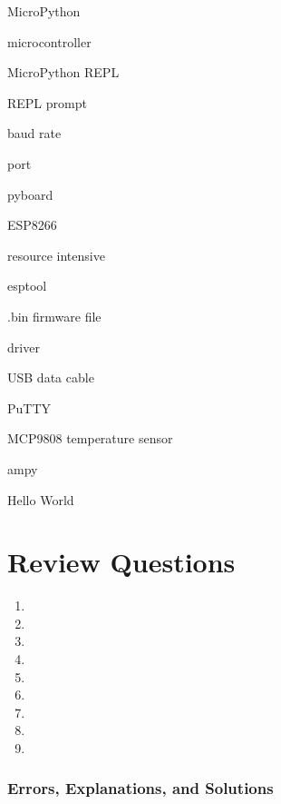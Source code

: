 \documentclass{book}
\newenvironment{problems}{}{}  %
\newenvironment{key_terms}{\begin{multicols}{3}}{\end{multicols}} %
\begin{document}
    
        \begin{key_terms}
        MicroPython

microcontroller

MicroPython REPL

REPL prompt

baud rate

port

pyboard

ESP8266

resource intensive

esptool

.bin firmware file

driver

USB data cable

PuTTY

MCP9808 temperature sensor

ampy

Hello World
        \end{key_terms}

    




    
        \section{Review Questions}\label{review-questions}
    




    
        \begin{problems}
        \begin{enumerate}
\def\labelenumi{\arabic{enumi}.}
\item
\item
\item
\item
\item
\item
\item
\item
\item
\end{enumerate}
        \end{problems}

    




    
        \subsubsection{Errors, Explanations, and
Solutions}\label{errors-explanations-and-solutions}
\end{document}
